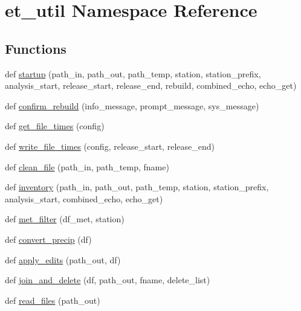 \hypertarget{namespaceet__util}{}\section{et\+\_\+util Namespace Reference}
\label{namespaceet__util}
\subsection*{Functions}
\begin{DoxyCompactItemize}
\item 
def \hyperlink{namespaceet__util_a164b6705ccf94cb947d6bd11c7c19021}{startup} (path\+\_\+in, path\+\_\+out, path\+\_\+temp, station, station\+\_\+prefix, analysis\+\_\+start, release\+\_\+start, release\+\_\+end, rebuild, combined\+\_\+echo, echo\+\_\+get)
\item 
def \hyperlink{namespaceet__util_ad79d083c0b67b0c0aa1c3f9f247bf856}{confirm\+\_\+rebuild} (info\+\_\+message, prompt\+\_\+message, sys\+\_\+message)
\item 
def \hyperlink{namespaceet__util_a3c3ae2439b3b5337237d456cb4366028}{get\+\_\+file\+\_\+times} (config)
\item 
def \hyperlink{namespaceet__util_aa4a0538c05ece93097940be5a2ef4204}{write\+\_\+file\+\_\+times} (config, release\+\_\+start, release\+\_\+end)
\item 
def \hyperlink{namespaceet__util_a7d463c3690915efb78c87700565efc77}{clean\+\_\+file} (path\+\_\+in, path\+\_\+temp, fname)
\item 
def \hyperlink{namespaceet__util_ad14756ce8dfea7ab6da605eb2a34af45}{inventory} (path\+\_\+in, path\+\_\+out, path\+\_\+temp, station, station\+\_\+prefix, analysis\+\_\+start, combined\+\_\+echo, echo\+\_\+get)
\item 
def \hyperlink{namespaceet__util_a241e2fa8182c03412e519a4c6431d29b}{met\+\_\+filter} (df\+\_\+met, station)
\item 
def \hyperlink{namespaceet__util_ac2422e9d685033121b1c6739352cf345}{convert\+\_\+precip} (df)
\item 
def \hyperlink{namespaceet__util_a51bdba14dfab7dd5e7884cec009abde7}{apply\+\_\+edits} (path\+\_\+out, df)
\item 
def \hyperlink{namespaceet__util_a3331dc365022196889cfcd3fa3cca3b2}{join\+\_\+and\+\_\+delete} (df, path\+\_\+out, fname, delete\+\_\+list)
\item 
def \hyperlink{namespaceet__util_adf3e6bef75b663226a9c118684f91689}{read\+\_\+files} (path\+\_\+out)
\item 

\end{DoxyCompactItemize}
